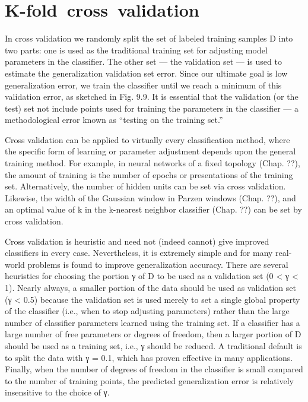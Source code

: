 \documentclass{article}
\begin{document}
\section{K-­fold cross validation}
In cross validation we randomly split the set of labeled training samples D into two
parts: one is used as the traditional training set for adjusting model parameters in the
classifier. The other set — the validation set — is used to estimate the generalization validation
set error. Since our ultimate goal is low generalization error, we train the classifier until
we reach a minimum of this validation error, as sketched in Fig. 9.9. It is essential that
the validation (or the test) set not include points used for training the parameters in
the classifier — a methodological error known as “testing on the training set.” 

Cross validation can be applied to virtually every classification method, where the
specific form of learning or parameter adjustment depends upon the general training method. For example, in neural networks of a fixed topology (Chap. ??), the amount
of training is the number of epochs or presentations of the training set. Alternatively,
the number of hidden units can be set via cross validation. Likewise, the width of the
Gaussian window in Parzen windows (Chap. ??), and an optimal value of k in the
k-nearest neighbor classifier (Chap. ??) can be set by cross validation.

Cross validation is heuristic and need not (indeed cannot) give improved classifiers
in every case. Nevertheless, it is extremely simple and for many real-world problems
is found to improve generalization accuracy. There are several heuristics for choosing
the portion γ of D to be used as a validation set (0 < γ < 1). Nearly always, a
smaller portion of the data should be used as validation set (γ < 0.5) because the
validation set is used merely to set a single global property of the classifier (i.e., when
to stop adjusting parameters) rather than the large number of classifier parameters
learned using the training set. If a classifier has a large number of free parameters
or degrees of freedom, then a larger portion of D should be used as a training set,
i.e., γ should be reduced. A traditional default is to split the data with γ = 0.1,
which has proven effective in many applications. Finally, when the number of degrees
of freedom in the classifier is small compared to the number of training points, the
predicted generalization error is relatively insensitive to the choice of γ.
\end{document}
